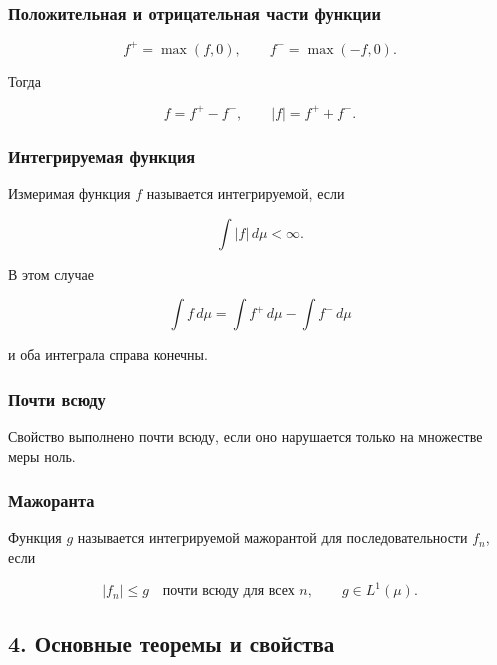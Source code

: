 \documentclass[
  11pt,
  a4paper,
]{article}
\begin{document}
\subsubsection{Положительная и отрицательная части
функции}\label{ux43fux43eux43bux43eux436ux438ux442ux435ux43bux44cux43dux430ux44f-ux438-ux43eux442ux440ux438ux446ux430ux442ux435ux43bux44cux43dux430ux44f-ux447ux430ux441ux442ux438-ux444ux443ux43dux43aux446ux438ux438}

\[
f^+=\max(f,0),\qquad
f^-=\max(-f,0).
\]

Тогда

\[
f=f^+-f^-,
\qquad
|f|=f^++f^-.
\]

\subsubsection{Интегрируемая
функция}\label{ux438ux43dux442ux435ux433ux440ux438ux440ux443ux435ux43cux430ux44f-ux444ux443ux43dux43aux446ux438ux44f}

Измеримая функция \(f\) называется интегрируемой, если

\[
\int |f|\,d\mu<\infty.
\]

В этом случае

\[
\int f\,d\mu=\int f^+\,d\mu-\int f^-\,d\mu
\]

и оба интеграла справа конечны.

\subsubsection{Почти
всюду}\label{ux43fux43eux447ux442ux438-ux432ux441ux44eux434ux443}

Свойство выполнено почти всюду, если оно нарушается только на множестве
меры ноль.

\subsubsection{Мажоранта}\label{ux43cux430ux436ux43eux440ux430ux43dux442ux430}

Функция \(g\) называется интегрируемой мажорантой для последовательности
\(f_n\), если

\[
|f_n|\le g\quad \text{почти всюду для всех }n,
\qquad
g\in L^1(\mu).
\]

\subsection{4. Основные теоремы и
свойства}\label{ux43eux441ux43dux43eux432ux43dux44bux435-ux442ux435ux43eux440ux435ux43cux44b-ux438-ux441ux432ux43eux439ux441ux442ux432ux430}
\end{document}
